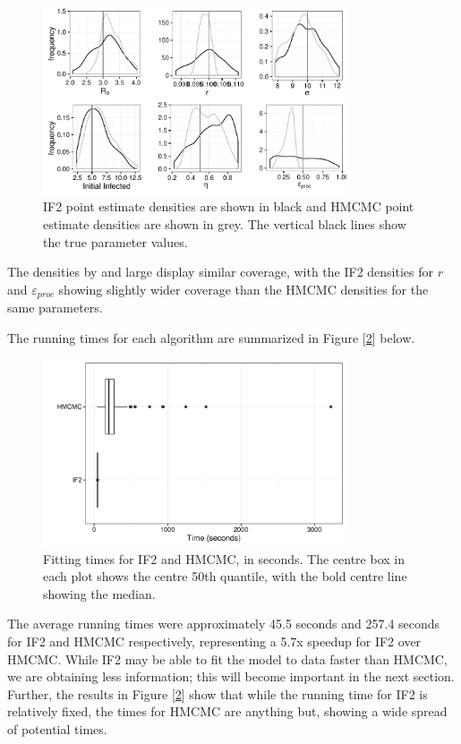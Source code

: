     \begin{figure}[H]
        \centering
        \captionsetup{width=.8\linewidth}
        \includegraphics[width=0.8\textwidth]{./images/combined-multi.pdf}
        \caption{IF2 point estimate densities are shown in black and HMCMC point estimate densities are shown in grey. The vertical black lines show the true parameter values.}
        \label{combinedmulti}
    \end{figure}

    The densities by and large display similar coverage, with the IF2 densities for $r$ and $\varepsilon_{proc}$ showing slightly wider coverage than the HMCMC densities for the same parameters.

    The running times for each algorithm are summarized in Figure [\ref{timeplot}] below.

	\begin{figure}[H]
        \centering
        \captionsetup{width=.8\linewidth}
        \includegraphics[width=0.8\textwidth]{./images/timeplot.pdf}
        \caption{Fitting times for IF2 and HMCMC, in seconds. The centre box in each plot shows the centre 50th quantile, with the bold centre line showing the median.}
        \label{timeplot}
    \end{figure}

    The average running times were approximately 45.5 seconds and 257.4 seconds for IF2 and HMCMC respectively, representing a 5.7x speedup for IF2 over HMCMC. While IF2 may be able to fit the model to data faster than HMCMC, we are obtaining less information; this will become important in the next section. Further, the results in Figure [\ref{timeplot}] show that while the running time for IF2 is relatively fixed, the times for HMCMC are anything but, showing a wide spread of potential times.
